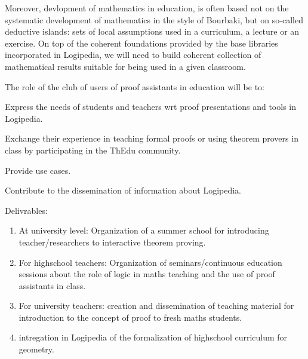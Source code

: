 \begin{workpackage}[id=dissemination,wphases=0-48,type=MGT,
  short=Dissemination,%
  title={Dissemination, communication and exploitation},
  lead=Inr]
\begin{tasklist}
\begin{task}[id=teachers-club,
      title=Expanding the use of Logipedia in education,
      lead=Str,StrRM=2]
    Moreover, devlopment of mathematics in education, is often based
    not on the systematic development of mathematics in the style of
    Bourbaki, but on so-called deductive islands: sets of local
    assumptions used in a curriculum, a lecture or an exercise.  On
    top of the coherent foundations provided by the base libraries
    incorporated in Logipedia, we will need to build coherent
    collection of mathematical results suitable for being used in a
    given classroom.

    The role of the club of users of proof assistants in education will be to:
    \begin{compactitem}
    \item Express the needs of students and teachers wrt proof
      presentations and tools in Logipedia.
    \item Exchange their experience in teaching formal proofs or using
      theorem provers in class by participating in the ThEdu community.
    \item Provide use cases.
    \item Contribute to the dissemination of information about Logipedia.
    \end{compactitem}

Delivrables:
\begin{enumerate}
\item At university level: Organization of a summer school for introducing teacher/researchers to interactive theorem proving.
\item For highschool teachers: Organization of seminars/continuous education sessions about the role of logic in maths teaching and the use of proof assistants in class.
\item For university teachers: creation and dissemination of teaching material for introduction to the concept of proof to fresh maths students.
\item intregation in Logipedia of the formalization of highschool curriculum for geometry.
\end{enumerate}

  \end{task}


\end{tasklist}
\end{workpackage}
